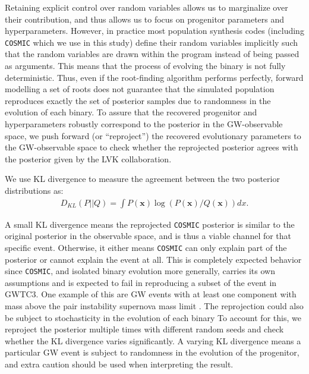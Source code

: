 \documentclass[twocolumn]{aastex631}
\newcommand{\wf}[1]{\textcolor{cyan}{WF: #1}}
\begin{document}
Retaining explicit control over random variables allows us to marginalize over
their contribution, and thus allows us to focus on progenitor parameters and
hyperparameters. However, in practice most population synthesis codes (including
\texttt{COSMIC} which we use in this study) define their random variables
implicitly such that the random variables are drawn within the program instead
of being passed as arguments. This means that the process of evolving the binary
is not fully deterministic. Thus, even if the root-finding algorithm performs
perfectly, forward modelling a set of roots does not guarantee that the
simulated population reproduces exactly the set of posterior samples due to
randomness in the evolution of each binary. To assure that the recovered
progenitor and hyperparameters robustly correspond to the posterior in the
GW-observable space, we push forward (or ``reproject'') the recovered
evolutionary parameters to the GW-observable space to check whether the
reprojected posterior agrees with the posterior given by the LVK collaboration.




We use KL divergence to measure the agreement between the two posterior
distributions as:
\begin{align}
D_{KL}(P||Q) = \int P(\bm{x}) \log(P(\bm{x})/Q(\bm{x})) dx.
\label{eq:KLdivergence}
\end{align}

\noindent A small KL divergence means the reprojected \texttt{COSMIC} posterior is similar to the original posterior in the
observable space, and is thus a viable channel for that specific event. Otherwise, it either means \texttt{COSMIC}
can only explain part of the posterior or cannot explain the event at all. This is completely expected behavior since
\texttt{COSMIC}, and isolated binary evolution more generally, carries its own assumptions and is expected to
fail in reproducing a subset of the event in GWTC3. One example of this are GW events with at least one component
with mass above the pair instability supernova mass limit \citep{Woosley2017, Farmer2020}.
The reprojection could also be subject to stochasticity in the evolution of each binary
To account for this, we reproject the posterior multiple times with different random seeds and
check whether the KL divergence varies significantly. A varying KL divergence means a particular GW event is subject
to randomness in the evolution of the progenitor, and extra caution should be used when interpreting the result.
\end{document}
